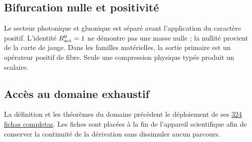 \begingroup
\let\chapter\section
\let\section\subsection
\let\subsection\subsubsection
\let\subsubsection\paragraph
\let\clearpage\relax

\endgroup

\section{Bifurcation nulle et positivité}
Le secteur photonique et gluonique est séparé avant l’application du caractère positif. L’identité \(R_{\rm act}^{0}=1\) ne démontre pas une masse nulle ; la nullité provient de la carte de jauge. Dans les familles matérielles, la sortie primaire est un opérateur positif de fibre. Seule une compression physique typée produit un scalaire.

\section{Accès au domaine exhaustif}
La définition et les théorèmes du domaine précèdent le déploiement de ses
\hyperref[chap:atlas-genealogico-exhaustivo-324-rutas]{324 fichas completas}. Les fiches sont placées à la fin de l’appareil scientifique afin de conserver la continuité de la dérivation sans dissimuler aucun parcours.
